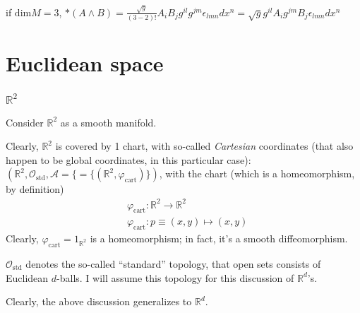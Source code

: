 \documentclass[10pt, twoside]{amsart}
\begin{document}
\begin{multicols*}{2}
if $\text{dim}M = 3$, $*(A\wedge B) = \frac{\sqrt{g}}{(3-2)!} A_i B_j g^{il} g^{jm} \epsilon_{lmn} dx^n = \sqrt{g} g^{il} A_i g^{jm} B_j \epsilon_{lmn}dx^n$




\part{Euclidean space}

\section{$\mathbb{R}^2$}

Consider $\mathbb{R}^2$ as a smooth manifold.  

Clearly, $\mathbb{R}^2$ is covered by 1 chart, with so-called \emph{Cartesian} coordinates (that also happen to be global coordinates, in this particular case): $(\mathbb{R}^2, \mathcal{O}_{\text{std}}, \mathcal{A} = \lbrace = \lbrace (\mathbb{R}^2, \varphi_{\text{cart}} ) \rbrace )$, with the chart (which is a homeomorphism, by definition)
\[
\begin{aligned}
  & \varphi_{\text{cart}} : \mathbb{R}^2 \to \mathbb{R}^2 \\ 
  & \varphi_{\text{cart}} : p \equiv (x,y) \mapsto (x,y)
\end{aligned}
\]
Clearly, $\varphi_{\text{cart}} = 1_{\mathbb{R}^2}$ is a homeomorphism; in fact, it's a smooth diffeomorphism.  

$\mathcal{O}_{\text{std}}$ denotes the so-called ``standard'' topology, that open sets consists of Euclidean $d$-balls.  I will assume this topology for this discussion of $\mathbb{R}^d$'s.  

Clearly, the above discussion generalizes to $\mathbb{R}^d$.  


\end{multicols*}
\end{document}

